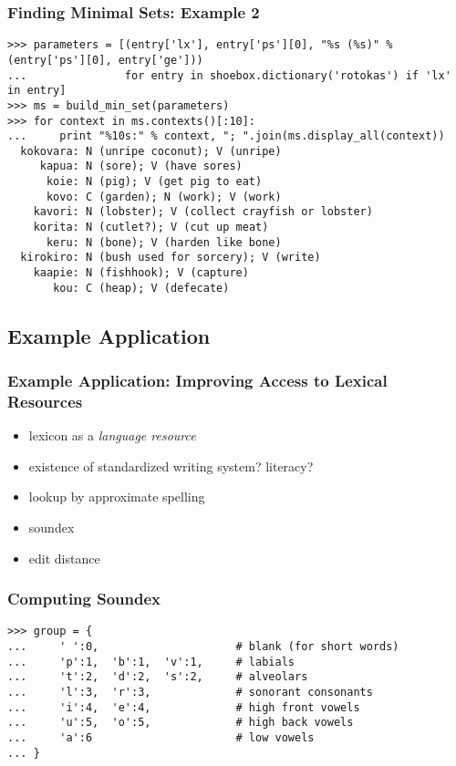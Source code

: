 \documentclass{beamer}
\begin{document}
\begin{frame}[fragile]
\frametitle{Finding Minimal Sets: Example 2}
\scriptsize

\begin{verbatim}
>>> parameters = [(entry['lx'], entry['ps'][0], "%s (%s)" % (entry['ps'][0], entry['ge']))
...               for entry in shoebox.dictionary('rotokas') if 'lx' in entry]
>>> ms = build_min_set(parameters)
>>> for context in ms.contexts()[:10]:
...     print "%10s:" % context, "; ".join(ms.display_all(context))
  kokovara: N (unripe coconut); V (unripe)
     kapua: N (sore); V (have sores)
      koie: N (pig); V (get pig to eat)
      kovo: C (garden); N (work); V (work)
    kavori: N (lobster); V (collect crayfish or lobster)
    korita: N (cutlet?); V (cut up meat)
      keru: N (bone); V (harden like bone)
  kirokiro: N (bush used for sorcery); V (write)
    kaapie: N (fishhook); V (capture)
       kou: C (heap); V (defecate)
\end{verbatim}
\end{frame}

\subsection{Example Application}

\begin{frame}
\frametitle{Example Application: Improving Access to Lexical Resources}
\begin{itemize}
\item lexicon as a \textit{language resource}
\item existence of standardized writing system?  literacy?
\item lookup by approximate spelling
\item soundex
\item edit distance
\end{itemize}
\end{frame}

\begin{frame}[fragile]
\frametitle{Computing Soundex}
\small

\begin{verbatim}
>>> group = {
...     ' ':0,                     # blank (for short words)
...     'p':1,  'b':1,  'v':1,     # labials
...     't':2,  'd':2,  's':2,     # alveolars
...     'l':3,  'r':3,             # sonorant consonants
...     'i':4,  'e':4,             # high front vowels
...     'u':5,  'o':5,             # high back vowels
...     'a':6                      # low vowels
... }
\end{verbatim}
\end{frame}
\end{document}
